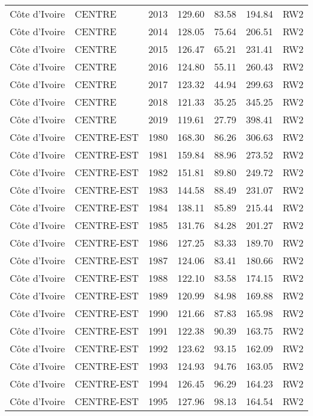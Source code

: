\begin{longtable}{lllrrrl}
  C\^{o}te d'Ivoire & CENTRE & 2013 & 129.60 & 83.58 & 194.84 & RW2 \\ 
  C\^{o}te d'Ivoire & CENTRE & 2014 & 128.05 & 75.64 & 206.51 & RW2 \\ 
  C\^{o}te d'Ivoire & CENTRE & 2015 & 126.47 & 65.21 & 231.41 & RW2 \\ 
  C\^{o}te d'Ivoire & CENTRE & 2016 & 124.80 & 55.11 & 260.43 & RW2 \\ 
  C\^{o}te d'Ivoire & CENTRE & 2017 & 123.32 & 44.94 & 299.63 & RW2 \\ 
  C\^{o}te d'Ivoire & CENTRE & 2018 & 121.33 & 35.25 & 345.25 & RW2 \\ 
  C\^{o}te d'Ivoire & CENTRE & 2019 & 119.61 & 27.79 & 398.41 & RW2 \\ 
  C\^{o}te d'Ivoire & CENTRE-EST & 1980 & 168.30 & 86.26 & 306.63 & RW2 \\ 
  C\^{o}te d'Ivoire & CENTRE-EST & 1981 & 159.84 & 88.96 & 273.52 & RW2 \\ 
  C\^{o}te d'Ivoire & CENTRE-EST & 1982 & 151.81 & 89.80 & 249.72 & RW2 \\ 
  C\^{o}te d'Ivoire & CENTRE-EST & 1983 & 144.58 & 88.49 & 231.07 & RW2 \\ 
  C\^{o}te d'Ivoire & CENTRE-EST & 1984 & 138.11 & 85.89 & 215.44 & RW2 \\ 
  C\^{o}te d'Ivoire & CENTRE-EST & 1985 & 131.76 & 84.28 & 201.27 & RW2 \\ 
  C\^{o}te d'Ivoire & CENTRE-EST & 1986 & 127.25 & 83.33 & 189.70 & RW2 \\ 
  C\^{o}te d'Ivoire & CENTRE-EST & 1987 & 124.06 & 83.41 & 180.66 & RW2 \\ 
  C\^{o}te d'Ivoire & CENTRE-EST & 1988 & 122.10 & 83.58 & 174.15 & RW2 \\ 
  C\^{o}te d'Ivoire & CENTRE-EST & 1989 & 120.99 & 84.98 & 169.88 & RW2 \\ 
  C\^{o}te d'Ivoire & CENTRE-EST & 1990 & 121.66 & 87.83 & 165.98 & RW2 \\ 
  C\^{o}te d'Ivoire & CENTRE-EST & 1991 & 122.38 & 90.39 & 163.75 & RW2 \\ 
  C\^{o}te d'Ivoire & CENTRE-EST & 1992 & 123.62 & 93.15 & 162.09 & RW2 \\ 
  C\^{o}te d'Ivoire & CENTRE-EST & 1993 & 124.93 & 94.76 & 163.05 & RW2 \\ 
  C\^{o}te d'Ivoire & CENTRE-EST & 1994 & 126.45 & 96.29 & 164.23 & RW2 \\ 
  C\^{o}te d'Ivoire & CENTRE-EST & 1995 & 127.96 & 98.13 & 164.54 & RW2 \\ 

\end{longtable}
